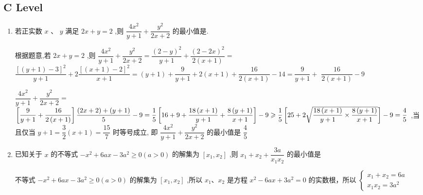 \subsection*{C Level}
\begin{enumerate}
    \item 若正实数 $x\text{ 、 }y$ 满足 ${2x} + y = 2$ ,则 $\dfrac{4{x}^{2}}{y + 1} + \dfrac{{y}^{2}}{{2x} + 2}$ 的最小值是.
    \begin{jieda}
        根据题意,若 ${2x} + y = 2$ ,则 $\dfrac{4{x}^{2}}{y + 1} + \dfrac{{y}^{2}}{{2x} + 2} = \dfrac{{\left( 2 - y\right) }^{2}}{y + 1} + \dfrac{{\left( 2 - 2x\right) }^{2}}{2\left( {x + 1}\right) } =$  $\dfrac{{\left\lbrack  \left( y + 1\right)  - 3\right\rbrack  }^{2}}{y + 1} + 2\dfrac{{\left\lbrack  \left( x + 1\right)  - 2\right\rbrack  }^{2}}{x + 1} = \left( {y + 1}\right)  + \dfrac{9}{y + 1} + 2\left( {x + 1}\right)  + \dfrac{16}{2\left( {x + 1}\right) } - {14} = \dfrac{9}{y + 1} +$  $\dfrac{16}{2\left( {x + 1}\right) } - 9$
        
         $\dfrac{4{x}^{2}}{y + 1} + \dfrac{{y}^{2}}{{2x} + 2} =$  $\left\lbrack  {\dfrac{9}{y + 1} + \dfrac{16}{2\left( {x + 1}\right) }}\right\rbrack  \dfrac{\left( {{2x} + 2}\right)  + \left( {y + 1}\right) }{5} - 9 \\
         = \dfrac{1}{5}\left\lbrack  {{16} + 9 + \dfrac{{18}\left( {x + 1}\right) }{y + 1} + \dfrac{8\left( {y + 1}\right) }{x + 1}}\right\rbrack   - 9 \geq \dfrac{1}{5}\left\lbrack  {{25} + 2\sqrt{\dfrac{{18}\left( {x + 1}\right) }{y + 1} \times  \dfrac{8\left( {y + 1}\right) }{x + 1}}}\right\rbrack   - 9 = \dfrac{4}{5}$ ,当且仅当 $y + 1 = \dfrac{3}{2}\left( {x + 1}\right)  = \dfrac{15}{7}$ 时等号成立, 即 $\dfrac{4{x}^{2}}{y + 1} + \dfrac{{y}^{2}}{{2x} + 2}$ 的最小值是 $\dfrac{4}{5}$
    \end{jieda}
    \item 已知关于 $x$ 的不等式 $- {x}^{2} + {6ax} - 3{a}^{2} \geq  0\left( {a > 0}\right)$ 的解集为 $\left\lbrack  {{x}_{1},{x}_{2}}\right\rbrack$ ,则 ${x}_{1} + {x}_{2} + \dfrac{3a}{{x}_{1}{x}_{2}}$ 的最小值是
    \begin{jieda}
         不等式 $- {x}^{2} + {6ax} - 3{a}^{2} \geq  0\left( {a > 0}\right)$ 的解集为 $\left\lbrack  {{x}_{1},{x}_{2}}\right\rbrack$ ,所以 ${x}_{1}\text{、}{x}_{2}$ 是方程 ${x}^{2} - {6ax} + 3{a}^{2} = 0$ 的实数根，所以 $\left\{  \begin{array}{l} {x}_{1} + {x}_{2} = {6a} \\  {x}_{1}{x}_{2} = 3{a}^{2}\end{array}\right.$
         

\end{jieda}
\end{enumerate}
